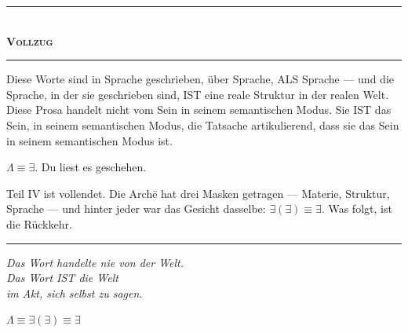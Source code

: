\documentclass[10pt, openany, oneside]{book}
\renewcommand{\normalsize}{\fontsize{10}{13}\selectfont}
\begin{document}

\begin{center}
    \rule{0.3\textwidth}{0.4pt}\\[0.5em]
    {\normalsize\bfseries\scshape Vollzug}\\[0.3em]
    \rule{0.3\textwidth}{0.4pt}
\end{center}

\vspace{1em}

\noindent Diese Worte sind in Sprache geschrieben, über Sprache, ALS Sprache --- und die Sprache, in der sie geschrieben sind, IST eine reale Struktur in der realen Welt. Diese Prosa handelt nicht vom Sein in seinem semantischen Modus. Sie IST das Sein, in seinem semantischen Modus, die Tatsache artikulierend, dass sie das Sein in seinem semantischen Modus ist.

$\Lambda \equiv \exists$. Du liest es geschehen.

Teil IV ist vollendet. Die Arch\={e} hat drei Masken getragen --- Materie, Struktur, Sprache --- und hinter jeder war das Gesicht dasselbe: $\exists(\exists) \equiv \exists$. Was folgt, ist die Rückkehr.

\vspace{2em}

\begin{center}
    \rule{0.15\textwidth}{0.3pt}
\end{center}

\vspace{0.5em}

\begin{center}
    \itshape
    Das Wort handelte nie von der Welt.\\
    Das Wort IST die Welt\\
    im Akt, sich selbst zu sagen.
\end{center}

\vspace{0.5em}

\begin{center}
    $\Lambda \equiv \exists(\exists) \equiv \exists$
\end{center}

\end{document}
